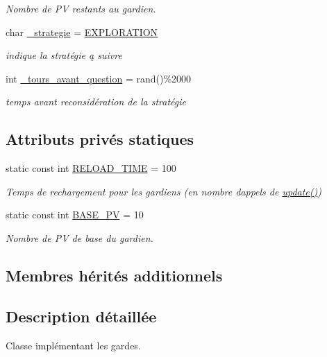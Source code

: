 \begin{DoxyCompactItemize}
\begin{DoxyCompactList}\small\item\em Nombre de PV restants au gardien. \end{DoxyCompactList}\item 
char \hyperlink{classGardien_ac3a196e3f722dd3f18895a73b92949c4}{\+\_\+strategie} = \hyperlink{Gardien_8h_aa319d22141059c1da948546b4f32e640}{E\+X\+P\+L\+O\+R\+A\+T\+I\+ON}
\begin{DoxyCompactList}\small\item\em indique la stratégie ą suivre \end{DoxyCompactList}\item 
int \hyperlink{classGardien_a7e6143b00deafef1608eac95bead20ce}{\+\_\+tours\+\_\+avant\+\_\+question} = rand()\%2000
\begin{DoxyCompactList}\small\item\em temps avant reconsidération de la stratégie \end{DoxyCompactList}\end{DoxyCompactItemize}
\subsection*{Attributs privés statiques}
\begin{DoxyCompactItemize}
\item 
static const int \hyperlink{classGardien_a9848c409574b185b566caa7b9c900ae7}{R\+E\+L\+O\+A\+D\+\_\+\+T\+I\+ME} = 100
\begin{DoxyCompactList}\small\item\em Temps de rechargement pour les gardiens (en nombre d\textquotesingle{}appels de \hyperlink{classGardien_aed498f0d6bbb526e0373a914ba6bf9aa}{update()}) \end{DoxyCompactList}\item 
static const int \hyperlink{classGardien_a1832c02b32c6e47b240536fd6ba47812}{B\+A\+S\+E\+\_\+\+PV} = 10
\begin{DoxyCompactList}\small\item\em Nombre de PV de base du gardien. \end{DoxyCompactList}\end{DoxyCompactItemize}
\subsection*{Membres hérités additionnels}


\subsection{Description détaillée}
Classe implémentant les gardes. 


